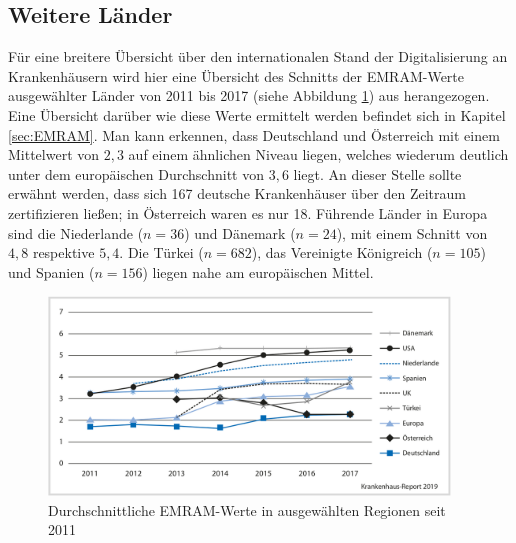 \subsection{Weitere Länder}
Für eine breitere Übersicht über den internationalen Stand der Digitalisierung an Krankenhäusern wird hier eine Übersicht des Schnitts der EMRAM-Werte ausgewählter Länder von 2011 bis 2017 (siehe Abbildung \ref{fig:andere_laender}) aus \cite{Stephani2019} herangezogen. Eine Übersicht darüber wie diese Werte ermittelt werden befindet sich in Kapitel \ref{sec:EMRAM}. Man kann erkennen, dass Deutschland und Österreich mit einem Mittelwert von $2,3$ auf einem ähnlichen Niveau liegen, welches wiederum deutlich unter dem europäischen Durchschnitt von $3,6$ liegt. An dieser Stelle sollte erwähnt werden, dass sich 167 deutsche Krankenhäuser über den Zeitraum zertifizieren ließen; in Österreich waren es nur 18. Führende Länder in Europa sind die Niederlande ($n=36$) und Dänemark ($n=24$), mit einem Schnitt von $4,8$ respektive $5,4$. Die Türkei ($n=682$), das Vereinigte Königreich ($n=105$) und Spanien ($n=156$) liegen nahe am europäischen Mittel.
\begin{figure}[ht]
	\includegraphics[width=0.95\textwidth]{Bilder/laendervergleich_EMRAM_Stephani_2019.png}
	\caption{Durchschnittliche EMRAM-Werte in ausgewählten Regionen seit 2011 \parencite{Stephani2019}}
	\label{fig:andere_laender}
\end{figure}
